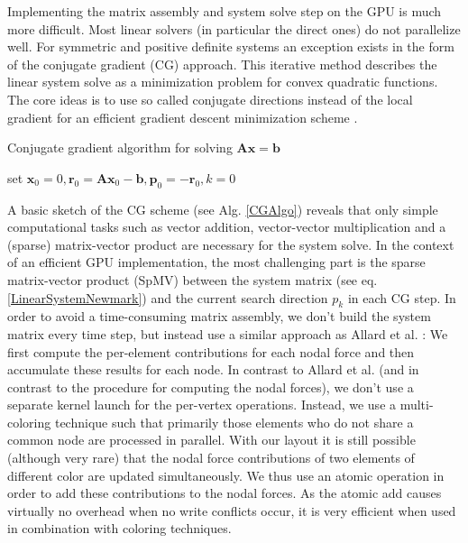 Implementing the matrix assembly and system solve step on the GPU is much more difficult. Most linear solvers (in particular the direct ones) do not parallelize well. For symmetric and positive definite systems an exception exists in the form of the conjugate gradient (CG) approach. This iterative method describes the linear system solve as a minimization problem for convex quadratic functions. The core ideas is to use so called conjugate directions instead of the local gradient for an efficient gradient descent minimization scheme \cite{Nocedal1999}. 


\begin{algorithm}  
\caption{Conjugate gradient algorithm for solving $\mathbf A \mathbf x = \mathbf b$}
\label{CGAlgo}
  \begin{algorithmic}
	\State set $\mathbf x_0=0, \mathbf r_0 = \mathbf A \mathbf x_0- \mathbf b, \mathbf p_0 = -\mathbf r_0, k=0$ 
	\EndIf
	\EndFor
  \end{algorithmic}
\end{algorithm}


A basic sketch of the CG scheme (see Alg. \ref{CGAlgo}) reveals that only simple computational tasks such as vector addition, vector-vector multiplication and a (sparse) matrix-vector product are necessary for the system solve. In the context of an efficient GPU implementation, the most challenging part is the sparse matrix-vector product (SpMV) between the system matrix (see eq. \ref{LinearSystemNewmark}) and the current search direction $p_k$ in each CG step. In order to avoid a time-consuming matrix assembly, we don't build the system matrix every time step, but instead use a similar approach as Allard et al. \cite{Allard2011}: We first compute the per-element contributions for each nodal force and then accumulate these results for each node. In contrast to Allard et al. (and in contrast to the procedure for computing the nodal forces), we don't use a separate kernel launch for the per-vertex operations. Instead, we use a multi-coloring technique such that primarily those elements who do not share a common node are processed in parallel. With our layout it is still possible (although very rare) that the nodal force contributions of two elements of different color are updated simultaneously. We thus use an atomic operation in order to add these contributions to the nodal forces. As the atomic add causes virtually no overhead when no write conflicts occur, it is very efficient when used in combination with coloring techniques. 

